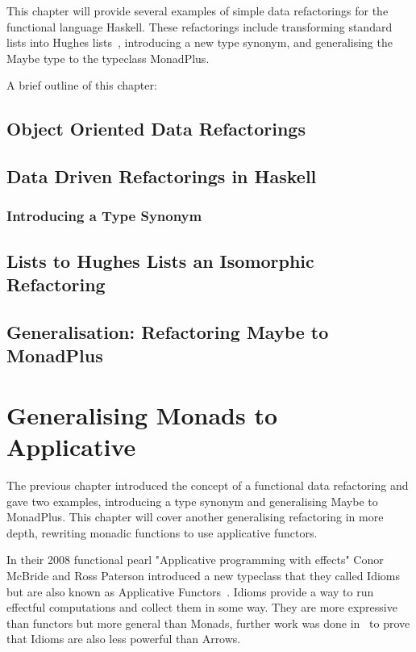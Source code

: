 This chapter will provide several examples of simple data refactorings for the functional language Haskell. These refactorings include transforming standard lists into Hughes lists~\citep{hughesList}, introducing a new type synonym, and generalising the Maybe type to the typeclass MonadPlus. 

A brief outline of this chapter:

\section{Object Oriented Data Refactorings}

\section{Data Driven Refactorings in Haskell}

\subsection{Introducing a Type Synonym}

\section{Lists to Hughes Lists an Isomorphic Refactoring}

\section{Generalisation: Refactoring Maybe to MonadPlus}


\chapter{Generalising Monads to Applicative}
\label{applicative}
The previous chapter introduced the concept of a functional data refactoring and gave two examples, introducing a type synonym and generalising Maybe to MonadPlus. This chapter will cover another generalising refactoring in more depth, rewriting monadic functions to use applicative functors. 

In their 2008 functional pearl "Applicative programming with effects" Conor McBride and Ross Paterson introduced a new typeclass that they called Idioms but are also known as Applicative Functors~\citep{mcbrideIdioms}. Idioms provide a way to run effectful computations and collect them in some way. They are more expressive than functors but more general than Monads, further work was done in~\citep{arrowsAndIdioms} to prove that Idioms are also less powerful than Arrows.

